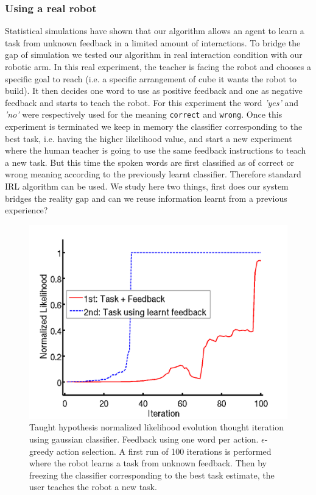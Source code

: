 \subsubsection{Using a real robot}
%
Statistical simulations have shown that our algorithm allows an agent to learn a task from unknown feedback in a limited amount of interactions. To bridge the gap of simulation we tested our algorithm in real interaction condition with our robotic arm. In this real experiment, the teacher is facing the robot and chooses a specific goal to reach (i.e. a specific arrangement of cube it wants the robot to build). It then decides one word to use as positive feedback and one as negative feedback and starts to teach the robot. For this experiment the word \textit{'yes'} and \textit{'no'} were respectively used for the meaning \texttt{correct} and \texttt{wrong}. Once this  experiment is terminated we keep in memory the classifier corresponding to the best task, i.e. having the higher likelihood value, and start a new experiment where the human teacher is going to use the same feedback instructions to teach a new task. But this time the spoken words are first classified as of correct or wrong meaning according to the previously learnt classifier. Therefore standard IRL algorithm can be used. We study here two things, first does our system bridges the reality gap and can we reuse information learnt from a previous experience? 
%
\begin{figure}[!htbp]
	\centering
		\includegraphics[width=\ww\columnwidth]{images/results/real}
	\caption{Taught hypothesis normalized likelihood evolution thought iteration using gaussian classifier.  Feedback using one word per action. $\epsilon$-greedy action selection. A first run of 100 iterations is performed where the robot learns a task from unknown feedback. Then by freezing the classifier corresponding to the best task estimate, the user teaches the robot a new task.}
	\label{Real}
\end{figure}

